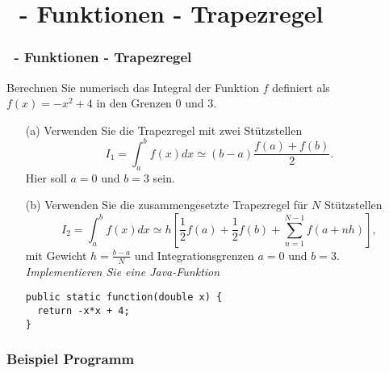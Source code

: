 \def\stitle{\theexercise\ - Funktionen - Trapezregel}
\section{\stitle}
\begin{frame}[fragile]%
    \frametitle{\stitle}

Berechnen Sie numerisch das Integral der Funktion $f$ definiert als $f(x) = -x^2+4$ in den Grenzen $0$ und $3$.
\begin{itemize}
\item[(a)] Verwenden Sie die Trapezregel mit zwei St\"utzstellen
\[
I_1
= \int_a^b f(x)dx
\simeq (b-a)\frac{f(a)+f(b)}{2}
.\]
Hier soll $a=0$ und $b=3$ sein.
\item[(b)] Verwenden Sie die zusammengesetzte Trapezregel für $N$ St\"utzstellen
\[
I_2
= \int_a^b f(x)dx
\simeq h \left[\frac{1}{2}f(a)+\frac{1}{2}f(b)+\sum_{n=1}^{N-1}f\left(a+nh \right)\right]
,\]
mit Gewicht $h = \frac{b-a}{N}$ und Integrationsgrenzen $a=0$ und $b=3$.
\emph{Implementieren Sie eine Java-Funktion}

\begin{lstlisting}[style=Java]
public static function(double x) {
  return -x*x + 4;
}
\end{lstlisting}
\end{itemize}


\end{frame}

\begin{frame}[t]%
  \frametitle{Beispiel Programm}%


\end{frame}
